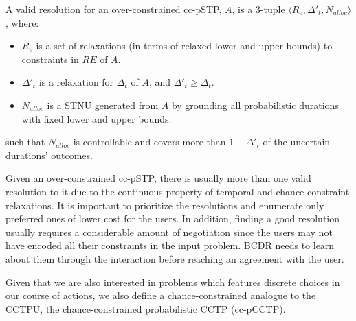 \documentclass[jair,twoside,11pt,theapa]{article}
\begin{document}
\begin{mydef}
	
	A valid resolution for an over-constrained cc-pSTP, $A$, is a 3-tuple $\langle
	R_e,\Delta'_t, N_{alloc}\rangle$, where:
	
	\begin{itemize}
		
		\item $R_e$ is a set of relaxations (in terms of relaxed lower and upper
		bounds) to constraints in $RE$ of $A$. 
		
		\item $\Delta'_t$ is a relaxation for $\Delta_t$ of $A$,
		and $\Delta'_t \geq \Delta_t$.
		
		\item $N_{alloc}$ is a STNU generated from $A$ by grounding all probabilistic
		durations with fixed lower and upper bounds. 
		
	\end{itemize}
	
	such that $N_{alloc}$ is  controllable and covers more than
	$1-\Delta'_t$ of the uncertain durations' outcomes.
	
\end{mydef}


Given an over-constrained cc-pSTP, there is usually more than one valid resolution to it due to
the continuous property of temporal and chance constraint relaxations. It is
important to prioritize the resolutions and enumerate only preferred ones of
lower cost for the users. In addition, finding a good resolution usually
requires a considerable amount of
negotiation since the users may not have encoded all their constraints in the
input problem. BCDR needs to learn about them through the
interaction before reaching an agreement with the user.
	
	
Given that we are also interested in problems which features discrete choices in our course of actions,
we also define a chance-constrained analogue to the CCTPU, the chance-constrained probabilistic CCTP (cc-pCCTP). 
\end{document}
